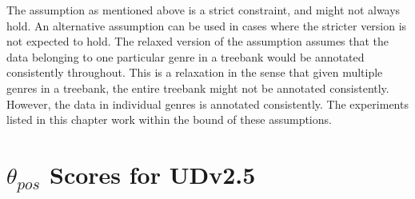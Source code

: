The assumption as mentioned above is a strict constraint, and might not always hold. An alternative assumption can be used in cases where the stricter version is not expected to hold. The relaxed version of the assumption assumes that the data belonging to one particular genre in a treebank would be annotated consistently throughout. This is a relaxation in the sense that given multiple genres in a treebank, the entire treebank might not be annotated consistently. However, the data in individual genres is annotated consistently. The experiments listed in this chapter work within the bound of these assumptions. 

\section{\texorpdfstring{$\theta_{pos}$}{theta\_pos} Scores for UDv2.5}
\label{sec:pos-harmony-scores}

